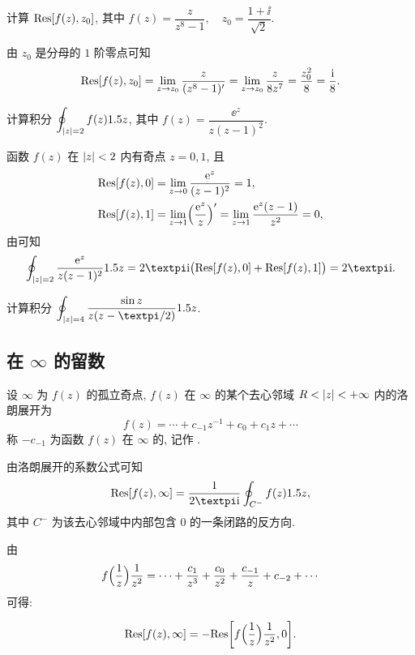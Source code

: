 \begin{example}
  计算 ${\mathrm{Res}}[f(z),z_0]$, 其中 $f(z)=\dfrac{z}{z^8-1},\quad z_0=\dfrac{1+\ii}{\sqrt2}$.
\end{example}

\begin{solution}
  由 $z_0$ 是分母的 $1$ 阶零点可知
  \[
     {\mathrm{Res}}[f(z),z_0]
    =\lim_{z\rightarrow z_0}\frac z{(z^8-1)'}
    =\lim_{z\rightarrow z_0}\frac z{8z^7}
    =\frac{z_0^2}8
    =\frac{\mathrm{i}}8.
  \]
\end{solution}

\begin{example}
  计算积分 $\displaystyle\oint_{\lvert z\rvert=2}f(z)1.5 z$, 其中 $f(z)=\dfrac{\ee^z}{z(z-1)^2}$.
\end{example}

\begin{solution}
  函数 $f(z)$ 在 $\lvert z\rvert<2$ 内有奇点 $z=0,1$, 且
  \begin{align*}
     {\mathrm{Res}}[f(z),0]&
    =\lim_{z\rightarrow0}\frac{\mathrm{e}^z}{(z-1)^2}
    =1,\\
     {\mathrm{Res}}[f(z),1]&
    =\lim_{z\rightarrow1}\Bigl(\frac{\mathrm{e}^z}z\Bigr)'
    =\lim_{z\rightarrow1}\frac{\mathrm{e}^z(z-1)}{z^2}
    =0,
  \end{align*}
  由\thmRes 可知
  \[
    \oint_{\abs{z}=2}\frac{\ee^z}{z(z-1)^2}\d z
    =2\cpi\ii\bigl(\Res[f(z),0]+\Res[f(z),1]\bigr)
    =2\cpi\ii.
  \]
\end{solution}

\begin{exercise}
  计算积分 $\doint_{\abs{z}=4}\frac{\sin z}{z(z-\cpi/2)}\d z$.
\end{exercise}


\subsection{在 \texorpdfstring{$\infty$}{∞} 的留数}

\begin{definition}
  设 $\infty$ 为 $f(z)$ 的孤立奇点, $f(z)$ 在 $\infty$ 的某个去心邻域 $R<\lvert z\rvert<+\infty$ 内的洛朗展开为
  \[
    f(z)=\cdots+c_{-1}z^{-1}+c_0+c_1z+\cdots
  \]
  称 $-c_{-1}$ 为函数 $f(z)$ 在 $\infty$ 的, 记作 \nouns{$\Res[f(z),\infty]$}.
\end{definition}

由洛朗展开的系数公式可知
\[
   \Res[f(z),\infty]
  =\frac1{2\cpi\ii}\oint_{C^-}f(z)\d z,
\]
其中 $C^-$ 为该去心邻域中内部包含 $0$ 的一条闭路的反方向.

由
\[
   f\Bigl(\frac1z\Bigr)\frac1{z^2}
  =\cdots+\frac{c_1}{z^3}+\frac{c_0}{z^2}+\frac{c_{-1}}z+c_{-2}+\cdots
\]
可得:
\begin{theorem}[留数计算公式 IV]
  \[
     {\mathrm{Res}}[f(z),\infty]
    =-{\mathrm{Res}}\biggl[f\Bigl(\frac1z\Bigr)\frac1{z^2},0\biggr].
  \]
\end{theorem}


